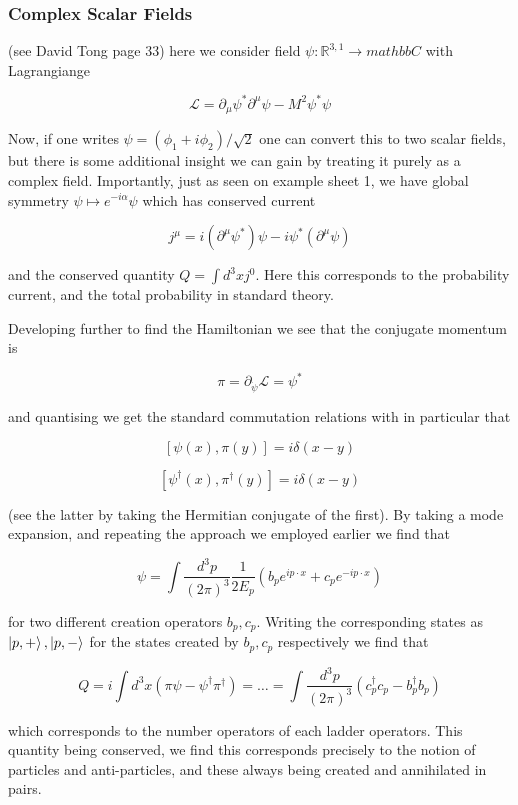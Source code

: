 \documentclass{article}
\theoremstyle{definition}
\begin{document}
\subsubsection{Complex Scalar Fields}

(see David Tong page 33) here we consider field $ \psi : \mathbb{R}^{3, 1} \to
mathbb{C}$ with Lagrangiange

$$ \mathcal{L} = \partial_\mu \psi^* \partial^\mu \psi - M^2 \psi^* \psi $$

Now, if one writes $\psi = (\phi_1 + i \phi_2) / \sqrt{2}$ one can convert this
to two scalar fields, but there is some additional insight we can gain by
treating it purely as a complex field. Importantly, just as seen on example
sheet 1, we have global symmetry $\psi \mapsto e^{-i\alpha} \psi$ which has
conserved current

$$ j^\mu = i(\partial^\mu \psi^*)\psi - i \psi^*(\partial^\mu \psi) $$

and the conserved quantity $Q = \int d^3x j^0$. Here this corresponds to the
probability current, and the total probability in standard theory.

Developing further to find the Hamiltonian we see that the conjugate momentum is

$$\pi = \partial_{\dot{\psi}} \mathcal{L} = \psi^* $$

and quantising we get the standard commutation relations with in particular that

$$ [\psi(x), \pi(y)] = i\delta(x - y) $$

$$ [\psi^\dagger(x), \pi^\dagger(y)] = i \delta(x - y) $$

(see the latter by taking the Hermitian conjugate of the first). By taking a
mode expansion, and repeating the approach we employed earlier we find that

$$ \psi = \int \frac{d^3p}{(2\pi)^3} \frac{1}{2 E_p} (b_p e^{ip \cdot x} + c_p
e^{-ip \cdot x}) $$

for two different creation operators $b_p, c_p$. Writing the corresponding
states as $\ket{p, +}, \ket{p, -}$ for the states created by $b_p, c_p$
respectively we find that

$$ Q = i \int d^3x (\pi \psi - \psi^\dagger \pi^\dagger) = \dots = \int
\frac{d^3p}{(2\pi)^3} (c_p^\dagger c_p - b_p^\dagger b_p) $$

which corresponds to the number operators of each ladder operators. This
quantity being conserved, we find this corresponds precisely to the notion of
particles and anti-particles, and these always being created and annihilated in
pairs. 
\end{document}

